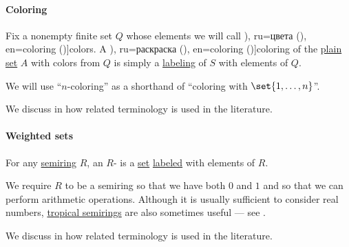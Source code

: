 \paragraph{Coloring}

\begin{definition}\label{def:set_coloring}\mimprovised
  Fix a nonempty finite set \( Q \) whose elements we will call \term[bg=цветове (\cite[141]{Мирчев2001}), ru=цвета (\cite[.1]{Новиков2013}), en=coloring (\cite[111]{Diestel2005})]{colors}. A \term[bg=оцветяване (\cite[141]{Мирчев2001}), ru=раскраска (\cite[.1]{Новиков2013}), en=coloring (\cite[111]{Diestel2005})]{coloring} of the \hyperref[def:plain_set]{plain set} \( A \) with colors from \( Q \) is simply a \hyperref[def:labeled_set]{labeling} of \( S \) with elements of \( Q \).

  We will use \enquote{\( n \)-coloring} as a shorthand of \enquote{coloring with \( \set{ 1, \ldots, n } \)}.
\end{definition}
\begin{comments}
  \item We discuss in  how related terminology is used in the literature.
\end{comments}

\paragraph{Weighted sets}

\begin{definition}\label{def:weighted_set}\mimprovised
  For any \hyperref[def:semiring]{semiring} \( R \), an \( R \)- is a \hyperref[def:set]{set} \hyperref[def:labeled_set]{labeled} with elements of \( R \).
\end{definition}
\begin{comments}
  \item We require \( R \) to be a semiring so that we have both \( 0 \) and \( 1 \) and so that we can perform arithmetic operations. Although it is usually sufficient to consider real numbers, \hyperref[def:tropical_semiring]{tropical semirings} are also sometimes useful --- see .

  \item We discuss in  how related terminology is used in the literature.
\end{comments}

